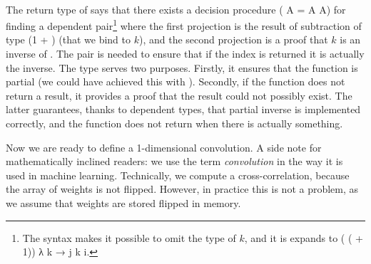 \begin{code}[hide]
\\
%
\>[2]\<%
\\
%
\\[\AgdaEmptyExtraSkip]%
%
\>[2]\<%
\\
%
\>[2]\<%
\\
%
\>[2]\<%
\\
%
\>[2]\<%
\end{code}
The return type of  says that there exists a decision procedure
( A = A   A) for finding a dependent pair\footnote{%
The  syntax makes it possible to omit the type of $k$, and it is
expands to  ( ( + 1)) λ k → j  k  i. 
}
where the first projection is the result of subtraction of type
 (1 + ) (that we bind to $k$), and the second projection
is a proof that $k$ is an inverse of .  The pair is needed to
ensure that if the index is returned it is actually the inverse.
The  type serves two purposes.  Firstly, it ensures that the
function is partial (we could have achieved this with ).
Secondly, if the function does not return a result, it provides a
proof that the result could not possibly exist.  The latter guarantees,
thanks to dependent types,  that partial inverse is implemented correctly,
and the function does not return  when there is actually
something.



Now we are ready to define a 1-dimensional convolution.
A side note for mathematically inclined readers: we use the term
\emph{convolution} in the way it is used in machine learning.  Technically,
we compute a cross-correlation, because the array of weights is not flipped.
However, in practice this is not a problem, as we assume that weights are
stored flipped in memory.

